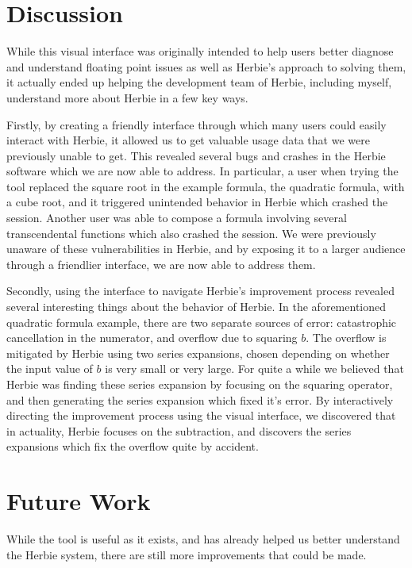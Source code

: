\documentclass{chi2009}
\begin{document}
\section{Discussion}
\label{sec:discussion}
While this visual interface was originally intended to help users
better diagnose and understand floating point issues as well as
Herbie's approach to solving them, it actually ended up helping the
development team of Herbie, including myself, understand more about
Herbie in a few key ways.

Firstly, by creating a friendly interface through which many users
could easily interact with Herbie, it allowed us to get valuable usage
data that we were previously unable to get. This revealed several bugs
and crashes in the Herbie software which we are now able to
address. In particular, a user when trying the tool replaced the
square root in the example formula, the quadratic formula, with a cube
root, and it triggered unintended behavior in Herbie which crashed the
session. Another user was able to compose a formula involving several
transcendental functions which also crashed the session. We were
previously unaware of these vulnerabilities in Herbie, and by exposing
it to a larger audience through a friendlier interface, we are now
able to address them.

Secondly, using the interface to navigate Herbie's improvement process
revealed several interesting things about the behavior of Herbie. In
the aforementioned quadratic formula example, there are two separate
sources of error: catastrophic cancellation in the numerator, and
overflow due to squaring $b$. The overflow is mitigated by Herbie
using two series expansions, chosen depending on whether the input
value of $b$ is very small or very large. For quite a while we
believed that Herbie was finding these series expansion by focusing on
the squaring operator, and then generating the series expansion which
fixed it's error. By interactively directing the improvement process
using the visual interface, we discovered that in actuality, Herbie
focuses on the subtraction, and discovers the series expansions which
fix the overflow quite by accident.

\section{Future Work}
\label{sec:future-work}

While the tool is useful as it exists, and has already helped us
better understand the Herbie system, there are still more improvements
that could be made.
\end{document}
